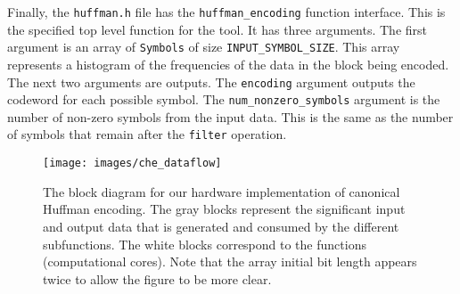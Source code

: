 Finally, the \lstinline{huffman.h} file has the \lstinline{huffman_encoding} function interface. This is the specified top level function for the \VHLS tool. It has three arguments. The first argument is an array of \lstinline{Symbols} of size \lstinline{INPUT_SYMBOL_SIZE}.  This array represents a histogram of the frequencies of the data in the block being encoded. The next two arguments are outputs. The \lstinline{encoding} argument outputs the codeword for each possible symbol. The \lstinline{num_nonzero_symbols} argument is the number of non-zero symbols from the input data. This is the same as the number of symbols that remain after the \lstinline{filter} operation. 

\begin{figure}
\centering
\texttt{[image: images/che\_dataflow]}
\caption{ The block diagram for our hardware implementation of canonical Huffman encoding. The gray blocks represent the significant input and output data that is generated and consumed by the different subfunctions. The white blocks correspond to the functions (computational cores). Note that the array initial bit length appears twice to allow the figure to be more clear.}
\label{fig:che_dataflow}
\end{figure}

